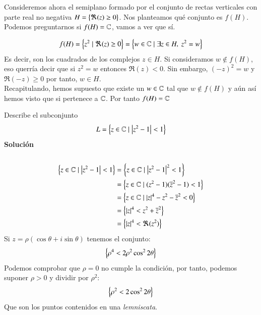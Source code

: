     Consideremos ahora el semiplano formado por el conjunto de rectas verticales con parte real no negativa $H = \left\{\Re(z) \geq 0\right\}$. Nos planteamos qué conjunto es $f(H)$. Podemos preguntarnos si $f(H) = \mathbb{C}$, vamos a ver que sí.

    $$
        f(H) = \left\{z^2 \mid \Re(z) \geq 0\right\} = \left\{w \in \mathbb{C} \mid \exists z \in H,\ z^2 = w\right\}
    $$
    Es decir, son los cuadrados de los complejos $z \in H$. Si consideramos $w \notin f(H)$, eso querría decir que si $z^2 = w$ entonces $\Re(z) < 0$. Sin embargo, $(-z)^2 = w$ y $\Re(-z) \geq 0$ por tanto, $w \in H$.\\
    Recapitulando, hemos supuesto que existe un $w \in \mathbb{C}$ tal que $w \notin f(H)$ y aún así hemos visto que si pertenece a $\mathbb{C}$. Por tanto $f(H) = \mathbb{C}$

    \begin{th_ex}
        Describe el subconjunto
        $$
            L = \left\{z \in \mathbb{C} \mid \left|z^2-1\right| < 1\right\}
        $$
        \textbf{Solución}\\\\

        \begin{align*}
            \left\{z \in \mathbb{C} \mid \left|z^2-1\right| < 1\right\} &= \left\{z \in \mathbb{C} \mid \left|z^2-1\right|^2 < 1\right\}\\
            &= \left\{z \in \mathbb{C} \mid (z^2-1)(\overline{z} ^2 - 1) < 1\right\}\\
            &= \left\{z \in \mathbb{C} \mid \left|z\right|^4 - z^2 - \overline{z} ^2 < 0\right\}\\
            &= \left\{\left|z\right|^4 < z^2 + \overline{z} ^2\right\}\\
            &= \left\{\left|z\right|^4 < \Re(z^2)\right\}
        \end{align*}
        Si $z = \rho (\cos \theta + i \sin \theta)$ tenemos el conjunto:
        $$
            \left\{\rho^4 < 2 \rho^2 \cos^2 2\theta\right\}
        $$
        Podemos comprobar que $\rho = 0$ no cumple la condición, por tanto, podemos suponer $\rho > 0$ y dividir por $\rho^2$:
        $$
            \left\{\rho^2 < 2 \cos^2 2\theta\right\}
        $$
        Que son los puntos contenidos en una \textit{lemniscata}.
        \begin{center}
        \end{center}
    \end{th_ex}

